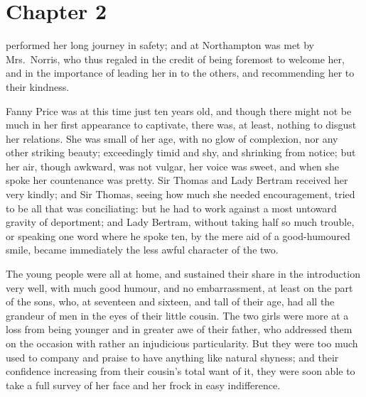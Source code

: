 \chapter{Chapter 2}

 performed her long journey in safety;
and at Northampton was met by Mrs.\ Norris, who thus
regaled in the credit of being foremost to welcome her,
and in the importance of leading her in to the others,
and recommending her to their kindness.

Fanny Price was at this time just ten years old,
and though there might not be much in her first appearance
to captivate, there was, at least, nothing to disgust
her relations.  She was small of her age, with no
glow of complexion, nor any other striking beauty;
exceedingly timid and shy, and shrinking from notice;
but her air, though awkward, was not vulgar, her voice
was sweet, and when she spoke her countenance was pretty.
Sir Thomas and Lady Bertram received her very kindly;
and Sir Thomas, seeing how much she needed encouragement,
tried to be all that was conciliating:  but he had
to work against a most untoward gravity of deportment;
and Lady Bertram, without taking half so much trouble,
or speaking one word where he spoke ten, by the mere aid
of a good-humoured smile, became immediately the less awful
character of the two.

The young people were all at home, and sustained their
share in the introduction very well, with much good humour,
and no embarrassment, at least on the part of the sons, who,
at seventeen and sixteen, and tall of their age, had all
the grandeur of men in the eyes of their little cousin.
The two girls were more at a loss from being younger
and in greater awe of their father, who addressed them
on the occasion with rather an injudicious particularity.
But they were too much used to company and praise to have
anything like natural shyness; and their confidence
increasing from their cousin's total want of it,
they were soon able to take a full survey of her face
and her frock in easy indifference.

